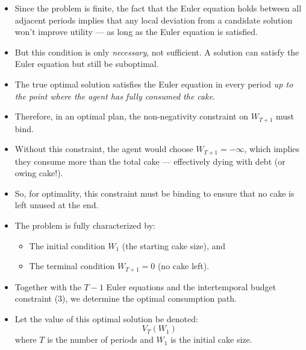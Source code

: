 \documentclass[12pt]{article}
\begin{document}
\begin{itemize}
    \item Since the problem is finite, the fact that the Euler equation holds between all adjacent periods implies that any local deviation from a candidate solution won't improve utility — as long as the Euler equation is satisfied.

    \item But this condition is only \textit{necessary}, not sufficient. A solution can satisfy the Euler equation but still be suboptimal.

    \item The true optimal solution satisfies the Euler equation in every period \textit{up to the point where the agent has fully consumed the cake}.

    \item Therefore, in an optimal plan, the non-negativity constraint on \( W_{T+1} \) must bind.

    \item Without this constraint, the agent would choose \( W_{T+1} = -\infty \), which implies they consume more than the total cake — effectively dying with debt (or owing cake!).

    \item So, for optimality, this constraint must be binding to ensure that no cake is left unused at the end.

    \item The problem is fully characterized by:
    \begin{itemize}
        \item The initial condition \( W_1 \) (the starting cake size), and
        \item The terminal condition \( W_{T+1} = 0 \) (no cake left).
    \end{itemize}

    \item Together with the \( T - 1 \) Euler equations and the intertemporal budget constraint (3), we determine the optimal consumption path.

    \item Let the value of this optimal solution be denoted:
    \[
    V_T(W_1)
    \]
    where \( T \) is the number of periods and \( W_1 \) is the initial cake size.
\end{itemize}
\end{document}
